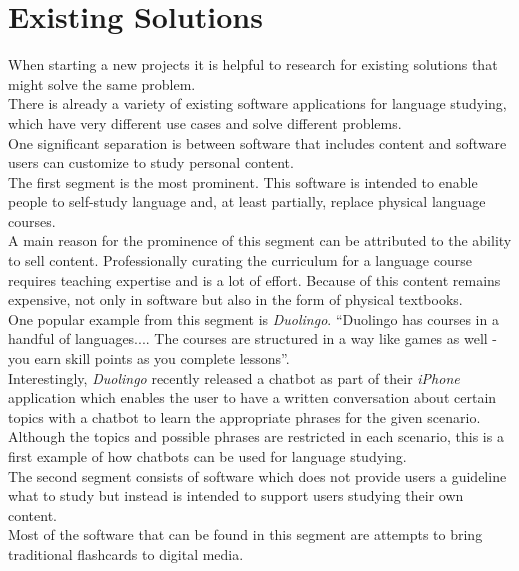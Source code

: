 \section{Existing Solutions}
\label{existing}


When starting a new projects it is helpful to research for existing solutions that might solve the same problem.
\\

There is already a variety of existing software applications for language studying, which have very different use cases and solve different problems.
\\

One significant separation is between software that includes content and software users can customize to study personal content.
\\

The first segment is the most prominent.
This software is intended to enable people to self-study language and, at least partially, replace physical language courses.
\\
A main reason for the prominence of this segment can be attributed to the ability to sell content.
Professionally curating the curriculum for a language course requires teaching expertise and is a lot of effort. Because of this content remains expensive, not only in software but also in the form of physical textbooks.
\\
One popular example from this segment is \emph{Duolingo}. ``Duolingo has courses in a handful of languages.... The courses are structured in a way like games as well - you earn skill points as you complete lessons''\cite{lifehacker}.
\\
Interestingly, \emph{Duolingo} recently released a chatbot\cite{topbots2} as part of their \emph{iPhone} application which enables the user to have a written conversation about certain topics with a chatbot to learn the appropriate phrases for the given scenario.
Although the topics and possible phrases are restricted in each scenario, this is a first example of how chatbots can be used for language studying.
\\

The second segment consists of software which does not provide users a guideline what to study but instead is intended to support users studying their own content.
\\
Most of the software that can be found in this segment are attempts to bring traditional flashcards to digital media.
\\

